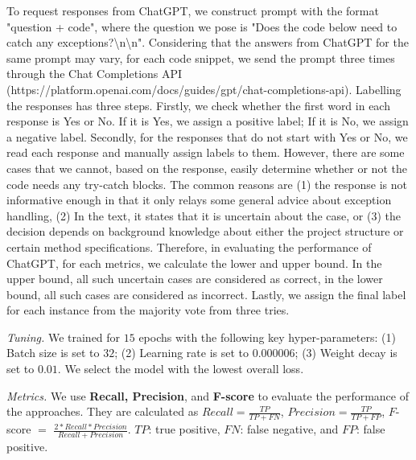 To request responses from ChatGPT, we construct prompt with the format
"question + code", where the question we pose is "Does the code below
need to catch any exceptions?\textbackslash n\textbackslash n".
Considering that the answers from ChatGPT for the same prompt may
vary, for each code snippet, we send the prompt three times through
the Chat Completions API
(https://platform.openai.com/docs/guides/gpt/chat-completions-api). Labelling
the responses has three steps. Firstly, we check whether the first
word in each response is Yes or No. If it is Yes, we assign a positive
label; If it is No, we assign a negative label. Secondly, for the
responses that do not start with Yes or No, we read each response and
manually assign labels to them.  However, there are some cases that we
cannot, based on the response, easily determine whether or not the
code needs any try-catch blocks. The common reasons are (1) the
response is not informative enough in that it only relays some general
advice about exception handling, (2) In the text, it states that it
is uncertain about the case, or (3) the decision depends on background
knowledge about either the project structure or certain method
specifications.  Therefore, in evaluating the performance of ChatGPT,
for each metrics, we calculate the lower and upper bound. In the upper
bound, all such uncertain cases are considered as correct,
in the lower bound, all such cases are considered as incorrect.
Lastly, we assign the final label for each instance from the majority
vote from three tries.



{\em Tuning.} We trained {\tool} for $15$ epochs with the following key hyper-parameters: (1) Batch size is set to $32$; (2) Learning rate is set to $0.000006$; (3) Weight decay is set to $0.01$. We select the model with the lowest overall loss. 


{\em Metrics.} We use \textbf{Recall, Precision}, and {\bf F-score} to
evaluate the performance of the approaches. They are calculated as
$Recall = \frac{TP}{TP+FN}$, $Precision = \frac{TP}{TP+FP}$, $F$-score
$=$ $\frac{2*Recall*Precision}{Recall+Precision}$. $TP$: true
positive, $FN$: false negative, and $FP$: false positive.
